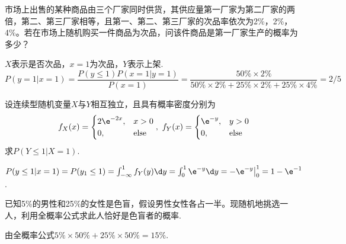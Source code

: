 \begin{problem}
    市场上出售的某种商品由三个厂家同时供货，其供应量第一厂家为第二厂家的两倍，第二、第三厂家相等，且第一、第二、第三厂家的次品率依次为2\%，2\%，4\%。若在市场上随机购买一件商品为次品，问该件商品是第一厂家生产的概率为多少？
\end{problem}
\begin{solution}
    $X$表示是否次品，$x=1$为次品，$Y$表示上架.
    \[P(y=1|x=1)=\frac{P(y\leq1)P(x=1|y=1)}{P(x=1)}=\frac{50\%\times2\%}{50\%\times2\%+25\%\times2\%+25\%\times4\%}=2/5\]
\end{solution}

\begin{problem}
    设连续型随机变量$X$与$Y$相互独立，且具有概率密度分别为
    \[f_X(x)=\begin{cases}
        2\e^{-2x}, & x>0\\
        0, & \text{else}
    \end{cases},\ 
    f_Y(x)=\begin{cases}
        \e^{-y}, & y>0\\
        0, & \text{else}
    \end{cases}\]
    求$P(Y\leq1|X=1)$.
\end{problem}
\begin{solution}
    $P(y\leq1|x=1)=P(y_1\leq1)=\int_{-\infty}^1f_Y(y)\d y=\int_0^1\e^{-y}\d y=-\e^{-y}\big|_0^1=1-\e^{-1}$.
\end{solution}

\begin{problem}
    已知5\%的男性和25\%的女性是色盲，假设男性女性各占一半。现随机地挑选一人，利用全概率公式求此人恰好是色盲者的概率.
\end{problem}
\begin{solution}
    由全概率公式$5\%\times50\%+25\%\times50\%=15\%$.
\end{solution}

